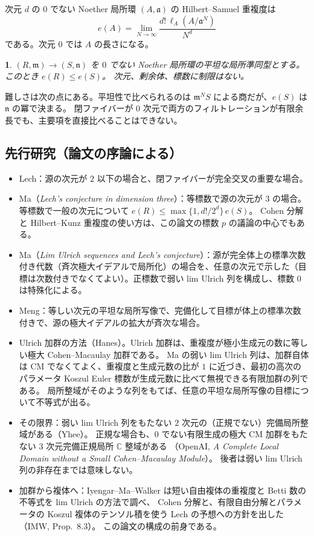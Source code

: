 \documentclass[11pt,a4paper]{ltjsarticle}
\newcommand{\stmtname}{}
\theoremstyle{plain}
\newtheorem*{stmtgen}{\stmtname}
\newenvironment{stmt}[1]{\renewcommand{\stmtname}{#1}\begin{stmtgen}}{\end{stmtgen}}
\theoremstyle{definition}
\newcommand{\m}{\mathfrak{m}}
\newcommand{\n}{\mathfrak{n}}
\begin{document}
次元 $d$ の $0$ でない Noether 局所環 $(A,\mathfrak{a})$ の Hilbert--Samuel 重複度は
\[
  e(A) = \lim_{N\to\infty}\frac{d!\,\ell_A(A/\mathfrak{a}^N)}{N^d}
\]
である。次元 $0$ では $A$ の長さになる。

\begin{stmt}{定理 1.1（Lech の予想）}
$(R,\m)\to(S,\n)$ を $0$ でない Noether 局所環の平坦な局所準同型とする。このとき $e(R)\le e(S)$。
次元、剰余体、標数に制限はない。
\end{stmt}

難しさは次の点にある。平坦性で比べられるのは $\m^NS$ による商だが、$e(S)$ は $\n$ の冪で決まる。
閉ファイバーが $0$ 次元で両方のフィルトレーションが有限余長でも、主要項を直接比べることはできない。

\subsection{先行研究（論文の序論による）}
\begin{itemize}
  \item Lech：源の次元が $2$ 以下の場合と、閉ファイバーが完全交叉の重要な場合。
  \item Ma（\emph{Lech's conjecture in dimension three}）：等標数で源の次元が $3$ の場合。等標数で一般の次元について $e(R)\le\max\{1,d!/2^d\}\,e(S)$。
  Cohen 分解と Hilbert--Kunz 重複度の使い方は、この論文の標数 $p$ の議論の中心でもある。
  \item Ma（\emph{Lim Ulrich sequences and Lech's conjecture}）：源が完全体上の標準次数付き代数（斉次極大イデアルで局所化）の場合を、任意の次元で示した（目標は次数付きでなくてよい）。正標数で弱い lim Ulrich 列を構成し、標数 $0$ は特殊化による。
  \item Meng：等しい次元の平坦な局所写像で、完備化して目標が体上の標準次数付きで、源の極大イデアルの拡大が斉次な場合。
  \item Ulrich 加群の方法（Hanes）。Ulrich 加群は、重複度が極小生成元の数に等しい極大 Cohen--Macaulay 加群である。
  Ma の弱い lim Ulrich 列は、加群自体は CM でなくてよく、重複度と生成元数の比が $1$ に近づき、最初の高次のパラメータ Koszul Euler 標数が生成元数に比べて無視できる有限加群の列である。
  局所整域がそのような列をもてば、任意の平坦な局所写像の目標について不等式が出る。
  \item その限界：弱い lim Ulrich 列をもたない $2$ 次元の（正規でない）完備局所整域がある（Yhee）。
  正規な場合も、$0$ でない有限生成の極大 CM 加群をもたない $3$ 次元完備正規局所 $\mathbb{C}$ 整域がある
  （OpenAI, \emph{A Complete Local Domain without a Small Cohen--Macaulay Module}）。
  後者は弱い lim Ulrich 列の非存在までは意味しない。
  \item 加群から複体へ：Iyengar--Ma--Walker は短い自由複体の重複度と Betti 数の不等式を lim Ulrich の方法で調べ、
  Cohen 分解と、有限自由分解とパラメータの Koszul 複体のテンソル積を使う Lech の予想への方針を出した（IMW, Prop.~8.3）。
  この論文の構成の前身である。
\end{itemize}
\end{document}
